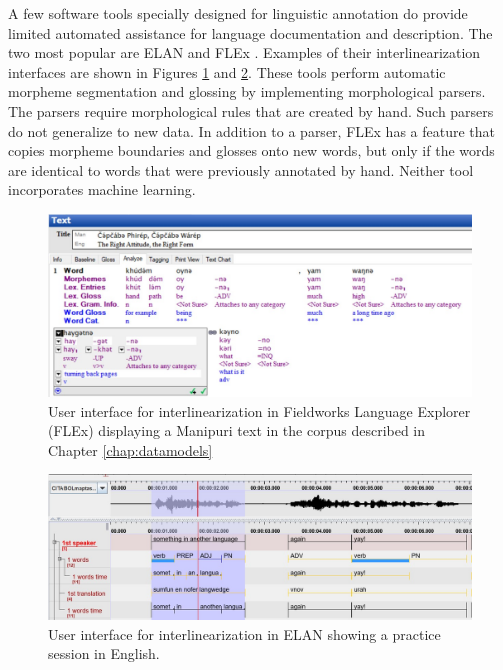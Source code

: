 A few software tools specially designed for linguistic annotation do provide limited automated assistance for language documentation and description. The two most popular are ELAN \citep{auer_elan_2010} and FLEx \citep{rogers_review_2010}. Examples of their interlinearization interfaces are shown in Figures \ref{fig:FLEX} and \ref{fig:ELAN}. These tools perform automatic morpheme segmentation and glossing by implementing morphological parsers. The parsers require morphological rules that are created by hand. Such parsers do not generalize to new data. In addition to a parser, FLEx has a feature that copies morpheme boundaries and glosses onto new words, but only if the words are identical to words that were previously annotated by hand. Neither tool incorporates machine learning. 

\begin{figure}[!tb]
    \centering
    \includegraphics[width=15cm]{figs/ManipuriFLEx.jpg}
    \caption[FLEx]{User interface for interlinearization in Fieldworks Language Explorer (FLEx) displaying a Manipuri text in the corpus described in Chapter \ref{chap:datamodels}}
    \label{fig:FLEX}
\end{figure}

\begin{figure}[!tb]
    \centering
    \includegraphics[width=12cm]{figs/ELANeng.jpg}
    \caption[ELAN]{User interface for interlinearization in ELAN showing a practice session in English.}
    \label{fig:ELAN}
\end{figure}


